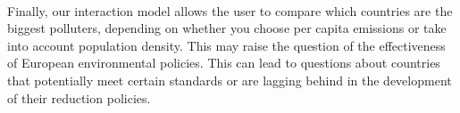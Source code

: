 \documentclass[preprint,journal]{vgtc}       %
\begin{document}
\paragraph{}
Finally, our interaction model allows the user to compare which countries are the biggest polluters, depending on whether you choose per capita emissions or take into account population density. This may raise the question of the effectiveness of European environmental policies. This can lead to questions about countries that potentially meet certain standards or are lagging behind in the development of their reduction policies.


%

%
%
%

\end{document}
